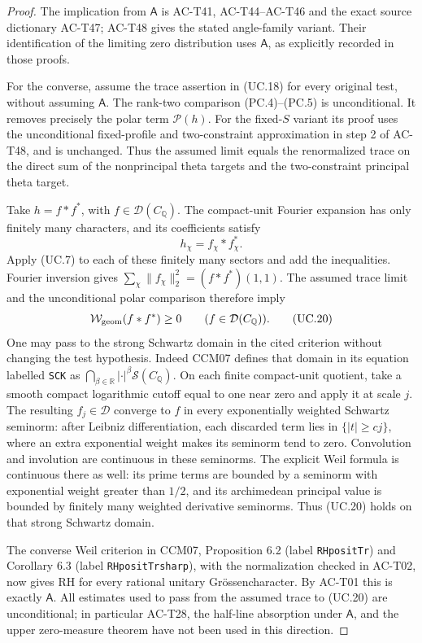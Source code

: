 \begin{proof}
The implication from \(\mathsf A\) is AC-T41,
AC-T44--AC-T46 and the exact source dictionary AC-T47;
AC-T48 gives the stated angle-family variant.
Their identification of the limiting zero distribution
uses \(\mathsf A\), as explicitly recorded in those proofs.

For the converse, assume the trace assertion in (UC.18)
for every original test, without assuming \(\mathsf A\).
The rank-two comparison (PC.4)--(PC.5) is unconditional.
It removes precisely the polar term \(\mathcal P(h)\).
For the fixed-\(S\) variant its proof uses the unconditional
fixed-profile and two-constraint approximation in step 2
of AC-T48, and is unchanged.
Thus the assumed limit equals the renormalized trace on
the direct sum of the nonprincipal theta targets and the
two-constraint principal theta target.

Take \(h=f*f^*\), with \(f\in\mathcal D(C_{\mathbb Q})\).
The compact-unit Fourier expansion has only finitely many
characters, and its coefficients satisfy
\[
                     h_\chi=f_\chi*f_\chi^* .
 \tag{UC.19}
\]
Apply (UC.7) to each of these finitely many sectors and
add the inequalities.  Fourier inversion gives
\(\sum_\chi\|f_\chi\|_2^2=(f*f^*)(1,1)\).
The assumed trace limit and the unconditional polar
comparison therefore imply
\[
                          \mathcal W_{\rm geom}(f*f^*)\geq0
               \qquad(f\in\mathcal D(C_{\mathbb Q})).
 \tag{UC.20}
\]
One may pass to the strong Schwartz domain in the cited
criterion without changing the test hypothesis.
Indeed CCM07 defines that domain in its equation
labelled \texttt{SCK} as
\(\bigcap_{\beta\in\mathbb R}|\cdot|^\beta\mathcal S(C_{\mathbb Q})\).
On each finite compact-unit quotient, take a smooth compact
logarithmic cutoff equal to one near zero and apply it at
scale \(j\).
The resulting \(f_j\in\mathcal D\) converge to \(f\) in
every exponentially weighted Schwartz seminorm: after
Leibniz differentiation, each discarded term lies in
\(\{|t|\geq c j\}\), where an extra exponential weight
makes its seminorm tend to zero.
Convolution and involution are continuous in these seminorms.
The explicit Weil formula is continuous there as well:
its prime terms are bounded by a seminorm with exponential
weight greater than \(1/2\), and its archimedean principal
value is bounded by finitely many weighted derivative
seminorms.
Thus (UC.20) holds on that strong Schwartz domain.

The converse Weil criterion in CCM07,
Proposition 6.2 (label \texttt{RHpositTr}) and
Corollary 6.3 (label \texttt{RHpositTrsharp}), with the
normalization checked in AC-T02, now gives RH for every
rational unitary Gr\"ossencharacter.
By AC-T01 this is exactly \(\mathsf A\).
All estimates used to pass from the assumed trace to
(UC.20) are unconditional; in particular AC-T28,
the half-line absorption under \(\mathsf A\), and the
upper zero-measure theorem have not been used in this
direction.
\end{proof}

